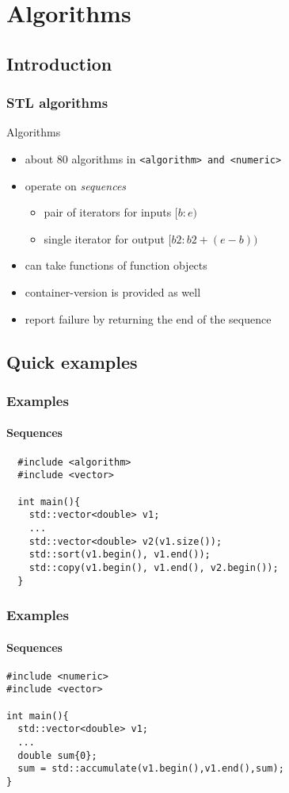 \section{Algorithms}
\subsection{Introduction}
\begin{frame}
  \frametitle{STL algorithms}
  \begin{block}{Algorithms}
    \begin{itemize}
    \item about 80 algorithms in \texttt{<algorithm> and <numeric>}
    \item operate on \emph{sequences}
      \begin{itemize}
      \item pair of iterators for inputs $[b:e)$
      \item single iterator for output $[b2: b2+(e-b))$
      \end{itemize}
    \item can take functions of function objects
    \item container-version is provided as well
    \item report failure by returning the end of the sequence
    \end{itemize}
  \end{block}
\end{frame}
\subsection{Quick examples}
\begin{frame}[fragile]
  \frametitle{Examples}
  \framesubtitle{Sequences}
\begin{lstlisting}
  #include <algorithm>
  #include <vector>
  
  int main(){
    std::vector<double> v1;
    ...
    std::vector<double> v2(v1.size());
    std::sort(v1.begin(), v1.end());
    std::copy(v1.begin(), v1.end(), v2.begin());
  }
\end{lstlisting}
\end{frame}

\begin{frame}[fragile]
  \frametitle{Examples}
  \framesubtitle{Sequences}
\begin{lstlisting}
#include <numeric>
#include <vector>
  
int main(){
  std::vector<double> v1;
  ...
  double sum{0};
  sum = std::accumulate(v1.begin(),v1.end(),sum);
}
\end{lstlisting}
\end{frame}

